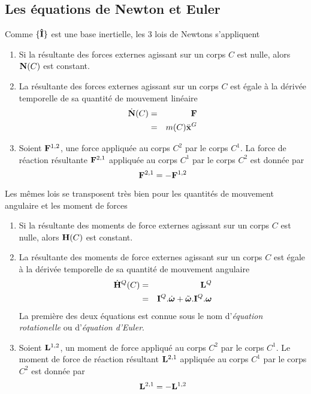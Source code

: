 \documentclass[11pt,a4paper]{article} %
\newcommand\fvdd[1]{\ddot{\bf #1}} %
\newcommand\ui{{\bf\hat{I}}} %
\newcommand\omegaf{{\bm \omega}}
\newcommand\omegafd{\dot{\bm \omega}}
\newcommand\omegaft{\tilde{\bm \omega}}
\newcommand\ine{{\bf I}}
\newcommand\st{{\bf L}}
\newcommand\lm{{\bf N}}
\newcommand\am{{\bf H}}
\newcommand\fo{{\bf F}}
\newcommand\xgdd{\fvdd{x}^G}
\begin{document}
\subsection{Les équations de Newton et Euler}
Comme $\{\ui\}$ est une base inertielle, les 3 lois de Newtons s'appliquent
\begin{enumerate}
	\item Si la résultante des forces externes agissant sur un corps $C$ est nulle, alors $\lm(C)$ est constant.
	\item La résultante des forces externes agissant sur un corps $C$ est égale à la dérivée temporelle de sa quantité de mouvement linéaire
		\begin{eqnarray*}
			\dot{\lm}(C) &=& \fo\\
			&=& m(C) \xgdd
		\end{eqnarray*}
	\item Soient $\fo^{1,2}$, une force appliquée au corps $C^2$ par le corps $C^1$.
		La force de réaction résultante $\fo^{2,1}$ appliquée au corps $C^1$ par le corps $C^2$ est donnée par
		\[ \fo^{2,1} = -\fo^{1,2} \]
\end{enumerate}

Les mêmes lois se transposent très bien pour les quantités de mouvement angulaire et les moment de forces
\begin{enumerate}
	\item Si la résultante des moments de force externes agissant sur un corps $C$ est nulle, alors $\am(C)$ est constant.
	\item La résultante des moments de force externes agissant sur un corps $C$ est égale à la dérivée temporelle de sa quantité de mouvement angulaire
		\begin{eqnarray*}
			\dot{\am}^Q(C) &=& \st^Q\\
			&=& \ine^Q.\omegafd + \omegaft.\ine^Q.\omegaf
		\end{eqnarray*}
		La première des deux équations est connue sous le nom d'{\em équation rotationelle} ou d'{\em équation d'Euler}.
	\item Soient $\st^{1,2}$, un moment de force appliqué au corps $C^2$ par le corps $C^1$.
		Le moment de force de réaction résultant $\st^{2,1}$ appliquée au corps $C^1$ par le corps $C^2$ est donnée par
		\[ \st^{2,1} = -\st^{1,2} \]
\end{enumerate}
\end{document}
